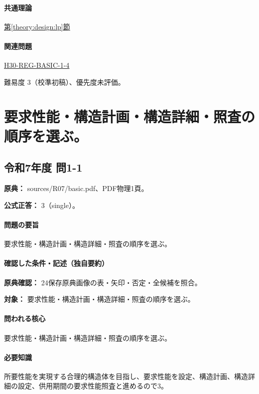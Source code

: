 \paragraph{共通理論} \hyperref[theory:design:lp]{第\ref*{theory:design:lp}節}

\paragraph{関連問題} \hyperref[q:h30-reg-basic-1-4]{H30-REG-BASIC-1-4}

\par 難易度 3（校準初稿）、優先度未評価。

\section{要求性能・構造計画・構造詳細・照査の順序を選ぶ。}

\subsection{令和7年度 問1-1}
\label{q:r07-reg-basic-1-1}

\noindent\textbf{原典：} sources/R07/basic.pdf、PDF物理1頁。

\textbf{公式正答：} 3（single）。

\paragraph{問題の要旨} 要求性能・構造計画・構造詳細・照査の順序を選ぶ。

\paragraph{確認した条件・記述（独自要約）}\mbox{}\par

\noindent\textbf{原典確認：} 24保存原典画像の表・矢印・否定・全候補を照合。\par

\noindent\textbf{対象：} 要求性能・構造計画・構造詳細・照査の順序を選ぶ。\par

\paragraph{問われる核心} 要求性能・構造計画・構造詳細・照査の順序を選ぶ。

\paragraph{必要知識} 所要性能を実現する合理的構造体を目指し、要求性能を設定、構造計画、構造詳細の設定、供用期間の要求性能照査と進めるので3。

